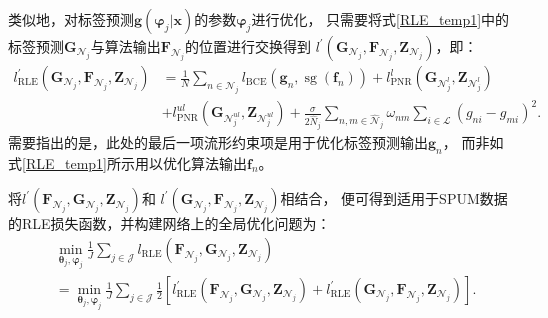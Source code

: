 类似地，对标签预测$\boldsymbol g\left(\boldsymbol\varphi_j|\boldsymbol x\right)$的参数$\boldsymbol\varphi_j$进行优化，
只需要将式\eqref{RLE_temp1}中的标签预测${\mathbf{G}}_{\mathcal{N}_j}$与算法输出$\mathbf{F}_{\mathcal{N}_j}$的位置进行交换得到
$l^{\prime}\left(\mathbf{G}_{\mathcal{N}_j}, \mathbf{F}_{\mathcal{N}_j}, \mathbf{Z}_{\mathcal{N}_j}\right)$，即：
\begin{equation}
    \label{RLE_temp2}
    \begin{split}
        l_{\mathrm{RLE}}^{\prime}\left(\mathbf{G}_{\mathcal{N}_j}, \mathbf{F}_{\mathcal{N}_j}, \mathbf{Z}_{\mathcal{N}_j}\right) 
        &=\frac{1}{N} \sum_{n \in \mathcal{N}_j} l_{\mathrm{BCE}}\left(\boldsymbol{g}_{n}, 
        \operatorname{sg}\left({\boldsymbol{f}}_{n}\right)\right)
        +l_{\mathrm{PNR}}^l\left(\boldsymbol{G}_{\mathcal{N}_j^l}, \boldsymbol{Z}_{\mathcal{N}_j^l}\right) \\
        &+l_{\mathrm{PNR}}^{ul}\left(\boldsymbol{G}_{\mathcal{N}_j^{ul}}, \boldsymbol{Z}_{\mathcal{N}_j^{ul}}\right)
        +\frac{\sigma}{2\hat{N}_j} \sum_{n,m \in \hat{\mathcal{N}}_j}{ \omega_{nm} \sum_{i \in \mathcal{L}}\left({g}_{ni}-{g}_{mi}\right)^2 }.
    \end{split}
\end{equation}
需要指出的是，此处的最后一项流形约束项是用于优化标签预测输出$\boldsymbol g_n$， 而非如式\eqref{RLE_temp1}所示用以优化算法输出$\boldsymbol f_n$。

将$l^{\prime}\left(\mathbf{F}_{\mathcal{N}_j} , {\mathbf{G}}_{\mathcal{N}_j}, \mathbf{Z}_{\mathcal{N}_j}\right)$和
$l^{\prime}\left({\mathbf{G}}_{\mathcal{N}_j}, \mathbf{F}_{\mathcal{N}_j}, \mathbf{Z}_{\mathcal{N}_j}\right)$相结合，
{便可得到适用于SPUM数据的RLE损失函数，并构建网络上的全局优化问题为：
\begin{equation}
    \label{RLE_min}
    \begin{split}
        &\min_{\boldsymbol\theta_j,\boldsymbol\varphi_j}\frac{1}{J}\sum_{j\in\mathcal{J}}
        l_{\mathrm{RLE}}\left(\mathbf{F}_{\mathcal{N}_j} , {\mathbf{G}}_{\mathcal{N}_j}, \mathbf{Z}_{\mathcal{N}_j}\right) \\
        &=\min_{\boldsymbol\theta_j,\boldsymbol\varphi_j}\frac{1}{J}\sum_{j\in\mathcal{J}} \frac{1}{2} \left[
        l_{\mathrm{RLE}}^{\prime}\left(\mathbf{F}_{\mathcal{N}_j} , {\mathbf{G}}_{\mathcal{N}_j}, \mathbf{Z}_{\mathcal{N}_j}\right)
        +l_{\mathrm{RLE}}^{\prime}\left({\mathbf{G}}_{\mathcal{N}_j}, \mathbf{F}_{\mathcal{N}_j}, \mathbf{Z}_{\mathcal{N}_j}\right)
        \right].
    \end{split}
\end{equation}}

